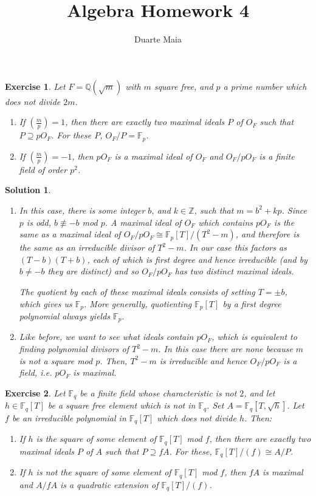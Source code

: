 \documentclass{article}
\title{Algebra Homework 4}
\author{Duarte Maia}
\newtheorem{ex}{Exercise}
\theoremstyle{nonumberplain}
\newtheorem{sol}{Solution}
\newcommand{\Z}{\mathbb{Z}}
\newcommand{\Q}{\mathbb{Q}}
\newcommand{\FF}{\mathbb{F}}
\newcommand{\legendre}[2]{\genfrac{(}{)}{}{}{#1}{#2}}
\begin{document}
\maketitle

\setcounter{ex}{21}

\begin{ex} Let $F = \Q(\sqrt m)$ with $m$ square free, and $p$ a prime number which does not divide $2m$.
\begin{enumerate}
\item If $\legendre mp = 1$, then there are exactly two maximal ideals $P$ of $O_F$ such that $P \supseteq p O_F$. For these $P$, $O_F/P = \FF_p$.
\item If $\legendre mp = -1$, then $p O_F$ is a maximal ideal of $O_F$ and $O_F/pO_F$ is a finite field of order $p^2$.
\end{enumerate}
\end{ex}

\begin{sol}
\leavevmode
\begin{enumerate}
\item In this case, there is some integer $b$, and $k \in \Z$, such that $m = b^2 + k p$. Since $p$ is odd, $b \not\equiv -b$ mod $p$. A maximal ideal of $O_F$ which contains $p O_F$ is the same as a maximal ideal of $O_F/pO_F \cong \FF_p[T]/(T^2-m)$, and therefore is the same as an irreducible divisor of $T^2 - m$. In our case this factors as $(T-b)(T+b)$, each of which is first degree and hence irreducible (and by $b \neq -b$ they are distinct) and so $O_F/pO_F$ has two distinct maximal ideals.

The quotient by each of these maximal ideals consists of setting $T = \pm b$, which gives us $\FF_p$. More generally, quotienting $\FF_p[T]$ by a first degree polynomial always yields $\FF_p$.

\item Like before, we want to see what ideals contain $p O_F$, which is equivalent to finding polynomial divisors of $T^2 - m$. In this case there are none because $m$ is not a square mod $p$. Then, $T^2 - m$ is irreducible and hence $O_F/pO_F$ is a field, i.e. $p O_F$ is maximal.
\end{enumerate}
\end{sol}

\begin{ex}
Let $\FF_q$ be a finite field whose characteristic is not $2$, and let $h \in \FF_q[T]$ be a square free element which is not in $\FF_q$. Set $A = \FF_q[T, \sqrt h]$. Let $f$ be an irreducible polynomial in $\FF_q[T]$ which does not divide $h$. Then:
\begin{enumerate}
\item If $h$ is the square of some element of $\FF_q[T]$ mod $f$, then there are exactly two maximal ideals $P$ of $A$ such that $P \supseteq f A$. For these, $\FF_q[T]/(f) \cong A/P$.
\item If $h$ is not the square of some element of $\FF_q[T]$ mod $f$, then $f A$ is maximal and $A/f A$ is a quadratic extension of $\FF_q[T]/(f)$.
\end{enumerate}
\end{ex}
\end{document}
